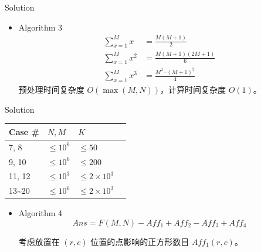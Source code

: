 \documentclass[UTF8]{beamer}
\begin{document}
\begin{frame}{Solution}

\begin{itemize}
    \item Algorithm 3 \\
        \begin{align*}
            \sum_{x = 1}^{M} x  &= \frac{M(M+1)}{2} \\
            \sum_{x = 1}^{M} x^2 &= \frac{M(M+1)(2M+1)}{6} \\
            \sum_{x = 1}^{M} x^3 &= \frac{M^2 \cdot (M+1)^2}{4}
        \end{align*}
        \pause
        预处理时间复杂度 $O(\max(M, N))$，计算时间复杂度 $O(1)$。
\end{itemize}

\end{frame}

\begin{frame}{Solution}

\begin{tabularx}{\textwidth}{X|X|X|X} \hline
Case \# & $N, M$ & $K$ \\ \hline \hline
7, 8   & $\leq 10^6$ & $\leq 50$            \\ \hline
9, 10  & $\leq 10^6$ & $\leq 200$           \\ \hline
11, 12 & $\leq 10^3$ & $\leq 2 \times 10^3$ \\ \hline
13\textasciitilde 20 & $\leq 10^6$ & $\leq 2 \times 10^3$ \\ \hline
\end{tabularx}
\begin{itemize}
    \item Algorithm 4 \\
        $$
            Ans = F(M, N) - Aff_1 + Aff_2 - Aff_3 + Aff_4
        $$

        \pause
        考虑放置在 $(r, c)$ 位置的点影响的正方形数目 $Aff_1(r, c)$。
\end{itemize}

\end{frame}
\end{document}
